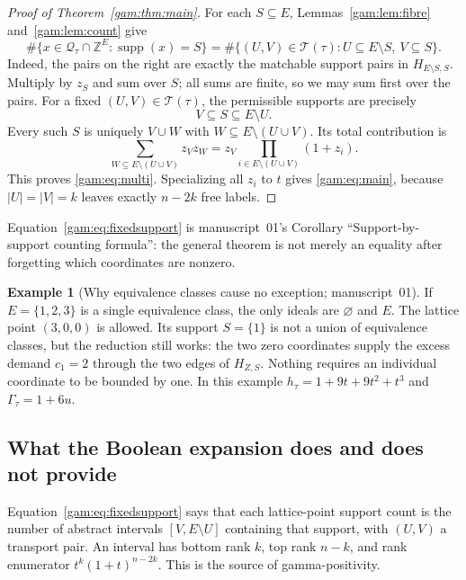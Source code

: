 \documentclass[11pt]{article}
\numberwithin{equation}{section}
\theoremstyle{definition}
\newtheorem{example}[theorem]{Example}%
\newcommand{\Z}{\mathbb Z}
\newcommand{\Qt}{\mathcal Q_\tau}
\newcommand{\supp}{\operatorname{supp}}
\newcommand{\Tset}{\mathcal T}
\begin{document}
\begin{proof}[Proof of Theorem~\ref{gam:thm:main}]
For each $S\subseteq E$, Lemmas~\ref{gam:lem:fibre} and~\ref{gam:lem:count} give
\begin{equation}
 \#\{x\in\Qt\cap\Z^E:\supp(x)=S\}
   =\#\{(U,V)\in\Tset(\tau):U\subseteq E\setminus S,\ V\subseteq S\}.
 \label{gam:eq:fixedsupport}
\end{equation}
Indeed, the pairs on the right are exactly the matchable support pairs in
$H_{E\setminus S,S}$. Multiply by $z_S$ and sum over $S$; all sums are
finite, so we may sum first over the pairs. For a fixed
$(U,V)\in\Tset(\tau)$, the permissible supports are precisely
\[
 V\subseteq S\subseteq E\setminus U.
\]
Every such $S$ is uniquely $V\cup W$ with
$W\subseteq E\setminus(U\cup V)$. Its total contribution is
\[
 \sum_{W\subseteq E\setminus(U\cup V)}z_Vz_W
   =z_V\prod_{i\in E\setminus(U\cup V)}(1+z_i).
\]
This proves \eqref{gam:eq:multi}. Specializing all $z_i$ to $t$ gives
\eqref{gam:eq:main}, because $|U|=|V|=k$ leaves exactly $n-2k$ free labels.
\end{proof}
Equation~\eqref{gam:eq:fixedsupport} is manuscript~01's Corollary
``Support-by-support counting formula'': the general theorem is not merely an
equality after forgetting which coordinates are nonzero.

\begin{example}[Why equivalence classes cause no exception; manuscript~01]\label{gam:gv:ex:equiv3}
If $E=\{1,2,3\}$ is a single equivalence class, the only ideals are
$\varnothing$ and $E$. The lattice point $(3,0,0)$ is allowed. Its support
$S=\{1\}$ is not a union of equivalence classes, but the reduction still
works: the two zero coordinates supply the excess demand $c_1=2$ through
the two edges of $H_{Z,S}$. Nothing requires an individual coordinate to be
bounded by one. In this example $h_\tau=1+9t+9t^2+t^3$ and
$\Gamma_\tau=1+6u$.
\end{example}

\subsection{What the Boolean expansion does and does not provide}
Equation~\eqref{gam:eq:fixedsupport} says that each lattice-point support count
is the number of abstract intervals
$[V,E\setminus U]$ containing that support, with $(U,V)$ a transport pair.
An interval has bottom rank $k$, top rank $n-k$, and rank enumerator
$t^k(1+t)^{n-2k}$. This is the source of gamma-positivity.
\end{document}
